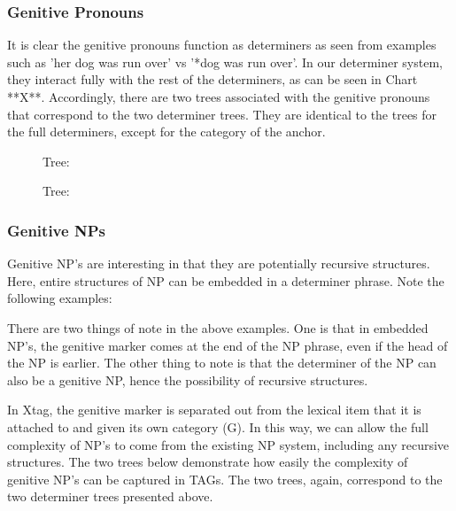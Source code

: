 \subsubsection{Genitive Pronouns}

It is clear the genitive pronouns function as determiners as seen from examples
such as 'her dog was run over' vs '*dog was run over'.  In our determiner
system, they interact fully with the rest of the determiners, as can be seen in
Chart **X**.  Accordingly, there are two trees associated with the genitive
pronouns that correspond to the two determiner trees.  They are identical to
the trees for the full determiners, except for the category of the anchor.



\begin{figure}[ht]
\centering
{}
\caption{ Tree:  }
\end{figure}


\begin{figure}[ht]
\centering
{}
\caption{ Tree:  }
\end{figure}

\subsubsection{Genitive NPs}

Genitive NP's are interesting in that they are potentially recursive
structures.  Here, entire structures of NP can be embedded in a determiner
phrase.  Note the following examples:

  

There are two things of note in the above examples.  One is that in embedded
NP's, the genitive marker comes at the end of the NP phrase, even if the head
of the NP is earlier.  The other thing to note is that the determiner of the NP
can also be a genitive NP, hence the possibility of recursive structures.  

In Xtag, the genitive marker is separated out from the lexical item that it is
attached to and given its own category (G).  In this way, we can allow the full
complexity of NP's to come from the existing NP system, including any recursive
structures.  The two trees below demonstrate how easily the complexity of
genitive NP's can be captured in TAGs.  The two trees, again, correspond to the two
determiner trees presented above.


